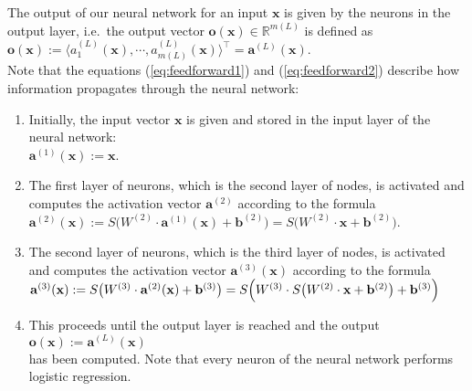 The output of our neural network for an input $\mathbf{x}$ is given by the neurons in the output
layer,  i.e.~the output vector 
$\mathbf{o}(\mathbf{x}) \in \mathbb{R}^{m(L)}$ is defined as 
\\[0.2cm]
\hspace*{1.3cm}
$\mathbf{o}(\mathbf{x}) := \langle a^{(L)}_1(\mathbf{x}), \cdots, a^{(L)}_{m(L)}(\mathbf{x}) \rangle^\top = \mathbf{a}^{(L)}(\mathbf{x})$.
\\[0.2cm]
Note that the equations (\ref{eq:feedforward1}) and (\ref{eq:feedforward2}) describe how information propagates
through the neural network: 
\begin{enumerate}
\item Initially, the input vector $\mathbf{x}$ is given and stored in the input layer of the neural network:
      \\[0.2cm]
      \hspace*{1.3cm}
      $\mathbf{a}^{(1)}(\mathbf{x}) := \mathbf{x}$.
\item The first layer of neurons, which is the second layer of nodes,  is activated and computes the activation
      vector $\mathbf{a}^{(2)}$ according to the formula
      \\[0.2cm]
      \hspace*{1.3cm}
      $\mathbf{a}^{(2)}(\mathbf{x}) := S\bigl(W^{(2)} \cdot \mathbf{a}^{(1)}(\mathbf{x}) + \mathbf{b}^{(2)}\bigr) = 
                                        S\bigl(W^{(2)} \cdot \mathbf{x} + \mathbf{b}^{(2)}\bigr)
      $.
\item The second layer of neurons, which is the third layer of nodes,  is activated and computes the activation
      vector $\mathbf{a}^{(3)}(\mathbf{x})$ according to the formula
      \\[0.2cm]
      \hspace*{1.3cm}
      $\mathbf{a}^{(3)}(\mathbf{x}) := S\bigl(W^{(3)} \cdot \mathbf{a}^{(2)}(\mathbf{x}) + \mathbf{b}^{(3)}\bigr)
                          = S\Bigl(W^{(3)} \cdot S\bigl(W^{(2)} \cdot \mathbf{x} + \mathbf{b}^{(2)}\bigr) + \mathbf{b}^{(3)}\Bigr)
        $
\item This proceeds until the output layer is reached and the output
      \\[0.2cm]
      \hspace*{1.3cm}
      $\mathbf{o}(\mathbf{x}) := \mathbf{a}^{(L)}(\mathbf{x})$
      \\[0.2cm]
      has been computed.  Note that every neuron of the neural network performs logistic regression.
\end{enumerate}
